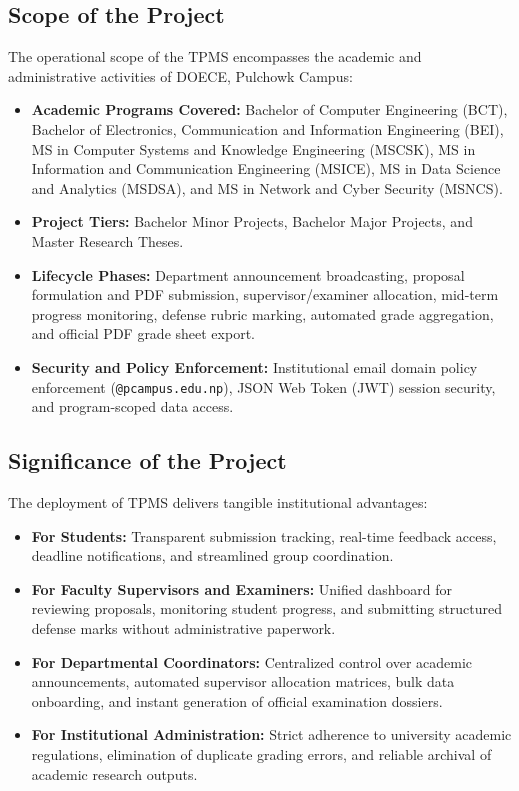 \subsection{Scope of the Project}
The operational scope of the TPMS encompasses the academic and administrative activities of DOECE, Pulchowk Campus:
\begin{itemize}
    \item \textbf{Academic Programs Covered:} Bachelor of Computer Engineering (BCT), Bachelor of Electronics, Communication and Information Engineering (BEI), MS in Computer Systems and Knowledge Engineering (MSCSK), MS in Information and Communication Engineering (MSICE), MS in Data Science and Analytics (MSDSA), and MS in Network and Cyber Security (MSNCS).
    \item \textbf{Project Tiers:} Bachelor Minor Projects, Bachelor Major Projects, and Master Research Theses.
    \item \textbf{Lifecycle Phases:} Department announcement broadcasting, proposal formulation and PDF submission, supervisor/examiner allocation, mid-term progress monitoring, defense rubric marking, automated grade aggregation, and official PDF grade sheet export.
    \item \textbf{Security and Policy Enforcement:} Institutional email domain policy enforcement (\texttt{@pcampus.edu.np}), JSON Web Token (JWT) session security, and program-scoped data access.
\end{itemize}

\subsection{Significance of the Project}
The deployment of TPMS delivers tangible institutional advantages:
\begin{itemize}
    \item \textbf{For Students:} Transparent submission tracking, real-time feedback access, deadline notifications, and streamlined group coordination.
    \item \textbf{For Faculty Supervisors and Examiners:} Unified dashboard for reviewing proposals, monitoring student progress, and submitting structured defense marks without administrative paperwork.
    \item \textbf{For Departmental Coordinators:} Centralized control over academic announcements, automated supervisor allocation matrices, bulk data onboarding, and instant generation of official examination dossiers.
    \item \textbf{For Institutional Administration:} Strict adherence to university academic regulations, elimination of duplicate grading errors, and reliable archival of academic research outputs.
\end{itemize}

